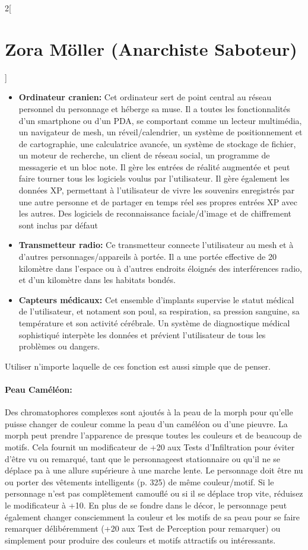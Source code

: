\documentclass[a4paper,9pt]{article}
\begin{document}
\begin{multicols}{2}[\section*{Zora Möller (Anarchiste Saboteur)}]
\begin{itemize}
   \item \textbf{Ordinateur cranien:} Cet ordinateur sert de point central au
      réseau personnel du personnage et héberge sa muse. Il a toutes
      les fonctionnalités d'un smartphone ou d'un PDA, se comportant comme un
      lecteur multimédia, un navigateur de mesh, un réveil/calendrier, un
      système de positionnement et de cartographie, une calculatrice avancée,
      un système de stockage de fichier, un moteur de recherche, un client de
      réseau social, un programme de messagerie et un bloc note. Il gère les
      entrées de réalité augmentée et peut faire tourner tous les logiciels
      voulus par l'utilisateur. Il gère également les données XP, permettant à
      l'utilisateur de vivre les souvenirs enregistrés par une autre personne et
      de partager en temps réel ses propres entrées XP avec les autres. Des
      logiciels de reconnaissance faciale/d'image et de chiffrement
      sont inclus par défaut
   \item \textbf{Transmetteur radio:} Ce transmetteur connecte l'utilisateur au
      mesh et à d'autres personnages/appareils à portée. Il a une portée
      effective de 20 kilomètre dans l'espace ou à d'autres endroits éloignés
      des interférences radio, et d'un kilomètre dans les habitats bondés.
   \item \textbf{Capteurs médicaux:} Cet ensemble d'implants supervise le
      statut médical de l'utilisateur, et notament son poul, sa respiration, sa
      pression sanguine, sa température et son activité cérébrale. Un système de
      diagnostique médical sophistiqué interpète les données et prévient
      l'utilisateur de tous les problèmes ou dangers.
\end{itemize} 

Utiliser n'importe laquelle de ces fonction est aussi simple que de penser.

\paragraph{Peau Caméléon:} Des chromatophores complexes sont ajoutés à la peau de
la morph pour qu'elle puisse changer de couleur comme la peau d'un caméléon ou
d'une pieuvre. La morph peut prendre l'apparence de presque toutes les couleurs
et de beaucoup de motifs. Cela fournit un modificateur de +20 aux Tests
d'Infiltration pour éviter d'être vu ou remarqué, tant que le personnageest
stationnaire ou qu'il ne se déplace pa à une allure supérieure à une marche
lente. Le personnage doit être nu ou porter des vêtements intelligents (p. 325)
de même couleur/motif. Si le personnage n'est pas complètement camouflé ou si
il se déplace trop vite, réduisez le modificateur à +10. En plus de se fondre
dans le décor, le personnage peut également changer consciemment la couleur et
les motifs de sa peau pour se faire remarquer délibéremment (+20 aux Test de
Perception pour remarquer) ou simplement pour produire des couleurs et motifs
attractifs ou intéressants.


\end{multicols}
\end{document}
